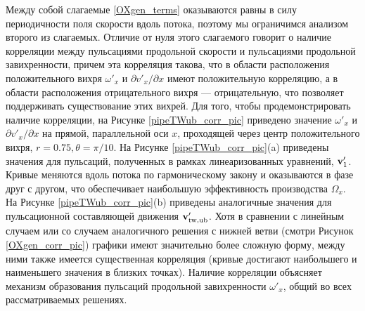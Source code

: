 Между собой слагаемые \eqref{OXgen_terms} оказываются равны в силу периодичности поля скорости вдоль потока, поэтому мы ограничимся анализом второго из слагаемых. Отличие от нуля этого слагаемого говорит о наличие корреляции между пульсациями продольной скорости и пульсациями продольной завихренности, причем эта корреляция такова, что в области расположения положительного вихря $\omega'_x$ и ${\partial v'_x}/{\partial x}$ имеют положительную корреляцию, а в области расположения отрицательного вихря --- отрицательную, что позволяет поддерживать существование этих вихрей. Для того, чтобы продемонстрировать наличие корреляции, на Рисунке \ref{pipeTWub_corr_pic} приведено значение $\omega'_x$ и ${\partial v'_x}/{\partial x}$ на прямой, параллельной оси $x$, проходящей через центр положительного вихря, $r = 0.75, \theta = \pi/10$. На Рисунке \ref{pipeTWub_corr_pic}(a) приведены значения для пульсаций, полученных в рамках линеаризованных уравнений, $\mathbf{v}'_1$. Кривые меняются вдоль потока по гармоническому закону и оказываются в фазе друг с другом, что обеспечивает наибольшую эффективность производства $\Omega_x$. На Рисунке \ref{pipeTWub_corr_pic}(b) приведены аналогичные значения для пульсационной составляющей движения $\mathbf{v}'_\mathrm{tw,ub}$. Хотя в сравнении с линейным случаем или со случаем аналогичного решения с нижней ветви (смотри Рисунок \ref{OXgen_corr_pic}) графики имеют значительно более сложную форму, между ними также имеется существенная корреляция (кривые достигают наибольшего и наименьшего значения в близких точках). Наличие корреляции объясняет механизм образования пульсаций продольной завихренности $\omega'_x$, общий во всех рассматриваемых решениях.

